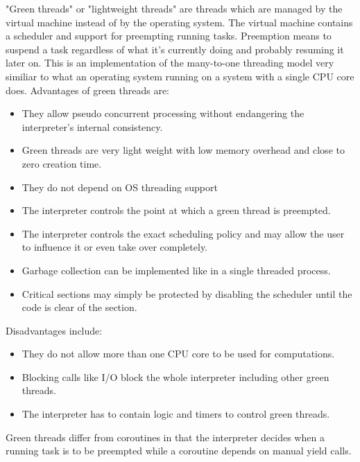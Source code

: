 \documentclass[bachelor,english]{hgbthesis}
\begin{document}
"Green threads" or "lightweight threads" are threads which are managed by the virtual machine instead of by the operating system. The virtual machine contains a scheduler and support for preempting running tasks.
Preemption means to suspend a task regardless of what it's currently doing and probably resuming it later on.
This is an implementation of the many-to-one threading model very similiar to what an operating system running on a system with a single CPU core does.
%
Advantages of green threads are:
%
\begin{itemize}
\item They allow pseudo concurrent processing without endangering the interpreter's internal consistency.
\item Green threads are very light weight with low memory overhead and close to zero creation time.
\item They do not depend on OS threading support
\item The interpreter controls the point at which a green thread is preempted.
\item The interpreter controls the exact scheduling policy and may allow the user to influence it or even take over completely.
\item Garbage collection can be implemented like in a single threaded process.
\item Critical sections may simply be protected by disabling the scheduler until the code is clear of the section.
\end{itemize}
%
Disadvantages include:
%
\begin{itemize}
\item They do not allow more than one CPU core to be used for computations.
\item Blocking calls like I/O block the whole interpreter including other green threads.
\item The interpreter has to contain logic and timers to control green threads.
\end{itemize}

Green threads differ from coroutines in that the interpreter decides when a running task is to be preempted while a coroutine depends on manual yield calls.
\end{document}
